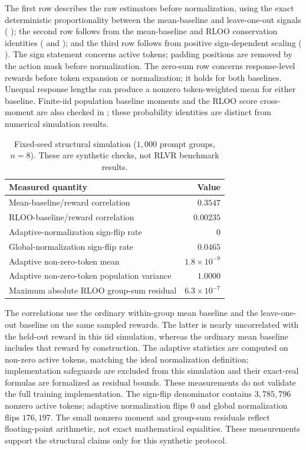 \noindent The first row describes the raw estimators before normalization,
using the exact deterministic proportionality between the mean-baseline and leave-one-out signals (
); the second row follows from the mean-baseline and RLOO
conservation identities ( and
); and the third row follows from positive sign-dependent scaling (
). The sign statement concerns active
tokens; padding positions are removed by the action mask before normalization.
The zero-sum row concerns response-level rewards before token expansion or
normalization; it holds for both baselines. Unequal response lengths can
produce a nonzero token-weighted mean for either baseline.
Finite-iid population baseline moments and the RLOO score cross-moment are
also checked in ; these probability identities
are distinct from numerical simulation results.

\begin{table}[ht]
\centering
\caption{Fixed-seed structural simulation ($1{,}000$ prompt groups, $n=8$). These are synthetic checks, not RLVR benchmark results.}
\renewcommand{\arraystretch}{1.15}
\small
\begin{tabular}{lr}
\toprule
\textbf{Measured quantity} & \textbf{Value} \\
\midrule
Mean-baseline/reward correlation & $0.3547$ \\
RLOO-baseline/reward correlation & $0.00235$ \\
Adaptive-normalization sign-flip rate & $0$ \\
Global-normalization sign-flip rate & $0.0465$ \\
Adaptive non-zero-token mean & $1.8\times10^{-9}$ \\
Adaptive non-zero-token population variance & $1.0000$ \\
Maximum absolute RLOO group-sum residual & $6.3\times10^{-7}$ \\
\bottomrule
\end{tabular}
\end{table}

The correlations use the ordinary within-group mean baseline and the
leave-one-out baseline on the same sampled rewards. The latter is nearly
uncorrelated with the held-out reward in this iid simulation, whereas the
ordinary mean baseline includes that reward by construction. The adaptive
statistics are computed on non-zero active tokens, matching the ideal
normalization definition; implementation safeguards are excluded from this simulation and their exact-real formulas are formalized as residual bounds. These measurements do not validate the full training implementation. The sign-flip denominator contains $3{,}785{,}796$ nonzero active tokens; adaptive normalization flips $0$ and global normalization flips $176{,}197$. The small nonzero moment and group-sum residuals reflect floating-point arithmetic, not exact mathematical equalities. These measurements
support the structural claims only for this synthetic protocol.

